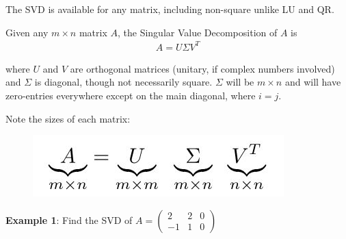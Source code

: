 \documentclass[10pt,a4paper]{article}
\begin{document}
The SVD is available for any matrix, including non-square unlike LU and QR.

Given any $m \times n$ matrix $A$, the Singular Value Decomposition of $A$ is
\begin{align*}
    A=U \Sigma V^{T}
\end{align*}

where $U$ and $V$ are orthogonal matrices (unitary, if complex numbers involved) and $\Sigma$ is
diagonal, though not necessarily square. $\Sigma$ will be $m \times n$ and will have zero-entries
everywhere except on the main diagonal, where $i = j$.

Note the sizes of each matrix:
\begin{figure} [h!]
    \centering
    \includegraphics[scale=0.7]{4.JPG}
\end{figure}

\pagebreak

\textbf{Example 1}: Find the SVD of $A = \begin{pmatrix}
    2&2&0\\-1&1&0
\end{pmatrix}$
\end{document}
